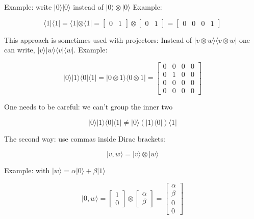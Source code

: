 \documentclass[main.tex]{subfiles}
\begin{document}
    Example: write $|0\rangle|0\rangle$ instead of $|0\rangle \otimes|0\rangle$ Example:
    
    $$
    \langle 1|\langle 1|=\langle 1| \otimes\langle 1|=\left[\begin{array}{ll}
    0 & 1
    \end{array}\right] \otimes\left[\begin{array}{ll}
    0 & 1
    \end{array}\right]=\left[\begin{array}{llll}
    0 & 0 & 0 & 1
    \end{array}\right]
    $$
    
    This approach is sometimes used with projectors: Instead of $|v \otimes w\rangle\langle v \otimes w|$ one can write, $|v\rangle|w\rangle\langle v|\langle w|$. Example:
    
    $$
    |0\rangle|1\rangle\langle 0|\langle 1|=| 0 \otimes 1\rangle\langle 0 \otimes 1|=\left[\begin{array}{llll}
    0 & 0 & 0 & 0 \\
    0 & 1 & 0 & 0 \\
    0 & 0 & 0 & 0 \\
    0 & 0 & 0 & 0
    \end{array}\right]
    $$
    
    One needs to be careful: we can't group the inner two
    
    $$
    |0\rangle|1\rangle\langle 0|\langle 1|\neq| 0\rangle(|1\rangle\langle 0|)\langle 1|
    $$
    
    The second way: use commas inside Dirac brackets:
    
    $$
    |v, w\rangle=|v\rangle \otimes|w\rangle
    $$
    
    Example: with $|w\rangle=\alpha|0\rangle+\beta|1\rangle$
    
    $$
    |0, w\rangle=\left[\begin{array}{l}
    1 \\
    0
    \end{array}\right] \otimes\left[\begin{array}{l}
    \alpha \\
    \beta
    \end{array}\right]=\left[\begin{array}{l}
    \alpha \\
    \beta \\
    0 \\
    0
    \end{array}\right]
    $$
    
\end{document}
